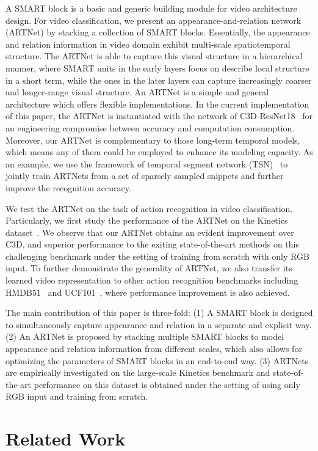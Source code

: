 \documentclass[10pt,twocolumn,letterpaper]{article}
\begin{document}
A SMART block is a basic and generic building module for video architecture design. For video classification, we present an appearance-and-relation network (ARTNet) by stacking a collection of SMART blocks. Essentially, the appearance and relation information in video domain exhibit multi-scale spatiotemporal structure. The ARTNet is able to capture this visual structure in a hierarchical manner, where SMART units in the early layers focus on describe local structure in a short term, while the ones in the later layers can capture increasingly coarser and longer-range visual structure. An ARTNet is a simple and general architecture which offers flexible implementations. In the current implementation of this paper, the ARTNet is instantiated with the network of C3D-ResNet18~\cite{Tran17} for an engineering compromise between accuracy and computation consumption. Moreover, our ARTNet is complementary to those long-term temporal models, which means any of them could be employed to enhance its modeling capacity. As an example, we use the framework of temporal segment network (TSN)~\cite{WangXWQLTV16} to jointly train ARTNets from a set of sparsely sampled snippets and further improve the recognition accuracy.

We test the ARTNet on the task of action recognition in video classification. Particularly, we first study the performance of the ARTNet on the Kinetics dataset~\cite{KayCSZHVVGBNSZ17}. We observe that our ARTNet obtains an evident improvement over C3D, and superior performance to the exiting state-of-the-art methods on this challenging benchmark under the setting of training from scratch with only RGB input. To further demonstrate the generality of ARTNet, we also transfer its learned video representation to other action recognition benchmarks including HMDB51~\cite{KuehneJGPS11} and UCF101~\cite{Soomro12}, where performance improvement is also achieved.

The main contribution of this paper is three-fold: (1) A SMART block is designed to simultaneously capture appearance and relation in a separate and explicit way. (2) An ARTNet is proposed by stacking multiple SMART blocks to model appearance and relation information from different scales, which also allows for optimizing the parameters of SMART blocks in an end-to-end way. (3) ARTNets are empirically investigated on the large-scale Kinetics benchmark and state-of-the-art performance on this dataset is obtained under the setting of using only RGB input and training from scratch. 

\section{Related Work}
\end{document}
